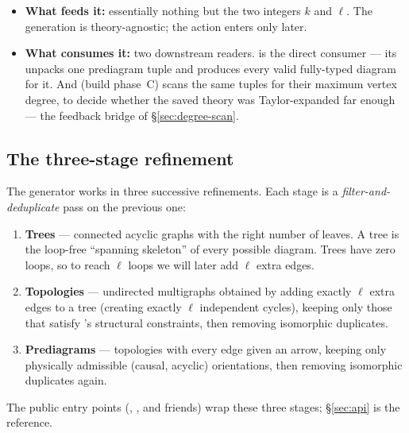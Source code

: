 \begin{itemize}
  \item \textbf{What feeds it:} essentially nothing but the two integers $k$ and
        $\ell$. The generation is theory-agnostic; the action enters only later.
  \item \textbf{What consumes it:} two downstream readers.
         is the direct consumer --- its
         unpacks one prediagram
        tuple  and produces every valid fully-typed
        diagram for it. And  (build
        phase~C) scans the same tuples for their maximum vertex degree, to decide
        whether the saved theory was Taylor-expanded far enough --- the feedback
        bridge of \S\ref{sec:degree-scan}.
\end{itemize}

\subsection{The three-stage refinement}

The generator works in three successive refinements. Each stage is a
\emph{filter-and-deduplicate} pass on the previous one:

\begin{enumerate}
  \item \textbf{Trees} --- connected acyclic graphs with the right number of
        leaves. A tree is the loop-free ``spanning skeleton'' of every possible
        diagram. Trees have zero loops, so to reach $\ell$ loops we will later add
        $\ell$ extra edges.
  \item \textbf{Topologies} --- undirected multigraphs obtained by adding exactly
        $\ell$ extra edges to a tree (creating exactly $\ell$ independent
        cycles), keeping only those that satisfy \msrjd's structural constraints,
        then removing isomorphic duplicates.
  \item \textbf{Prediagrams} --- topologies with every edge given an arrow,
        keeping only physically admissible (causal, acyclic) orientations, then
        removing isomorphic duplicates again.
\end{enumerate}

The public entry points (, ,
and friends) wrap these three stages; \S\ref{sec:api} is the reference.

